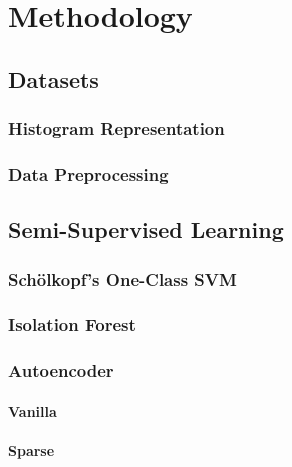 \chapter{Methodology}

\lipsum  %


\section{Datasets}

\subsection{Histogram Representation}
\lipsum  %

\subsection{Data Preprocessing}
\lipsum  %

\section{Semi-Supervised Learning}

\lipsum  %


\subsection{Sch\"{o}lkopf's One-Class SVM}

\lipsum  %


\subsection{Isolation Forest}

\lipsum  %

\subsection{Autoencoder}

\lipsum  %

\subsubsection{Vanilla}
\subsubsection{Sparse}